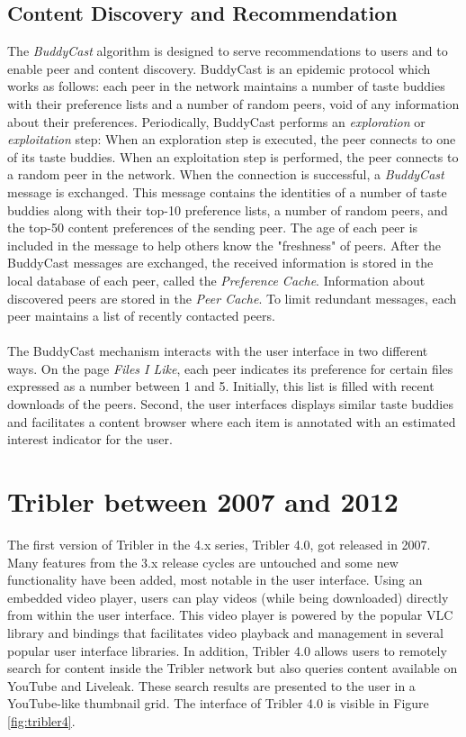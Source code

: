 \subsection{Content Discovery and Recommendation}
The \emph{BuddyCast} algorithm is designed to serve recommendations to users and to enable peer and content discovery. BuddyCast is an epidemic protocol which works as follows: each peer in the network maintains a number of taste buddies with their preference lists and a number of random peers, void of any information about their preferences. Periodically, BuddyCast performs an \emph{exploration} or \emph{exploitation} step: When an exploration step is executed, the peer connects to one of its taste buddies. When an exploitation step is performed, the peer connects to a random peer in the network. When the connection is successful, a \emph{BuddyCast} message is exchanged. This message contains the identities of a number of taste buddies along with their top-10 preference lists, a number of random peers, and the top-50 content preferences of the sending peer. The age of each peer is included in the message to help others know the "freshness" of peers. After the BuddyCast messages are exchanged, the received information is stored in the local database of each peer, called the \emph{Preference Cache}. Information about discovered peers are stored in the \emph{Peer Cache}. To limit redundant messages, each peer maintains a list of recently contacted peers.\\\\
The BuddyCast mechanism interacts with the user interface in two different ways. On the page \emph{Files I Like}, each peer indicates its preference for certain files expressed as a number between 1 and 5. Initially, this list is filled with recent downloads of the peers. Second, the user interfaces displays similar taste buddies and facilitates a content browser where each item is annotated with an estimated interest indicator for the user.

\section{Tribler between 2007 and 2012}
The first version of Tribler in the 4.x series, Tribler 4.0, got released in 2007\cite{tribler4tf}. Many features from the 3.x release cycles are untouched and some new functionality have been added, most notable in the user interface. Using an embedded video player, users can play videos (while being downloaded) directly from within the user interface. This video player is powered by the popular VLC library and bindings that facilitates video playback and management in several popular user interface libraries. In addition, Tribler 4.0 allows users to remotely search for content inside the Tribler network but also queries content available on YouTube and Liveleak. These search results are presented to the user in a YouTube-like thumbnail grid. The interface of Tribler 4.0 is visible in Figure \ref{fig:tribler4}.\\

